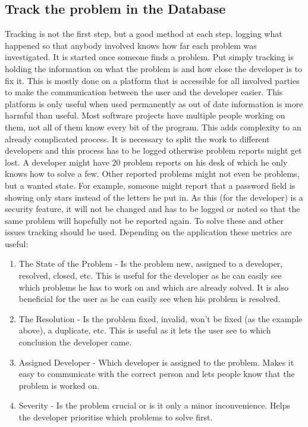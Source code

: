 \subsection{Track the problem in the Database}
\label{aodZellerTrack}
Tracking is not the first step, but a good method at each step, logging what happened so that anybody involved knows how far each problem was investigated. It is started once someone finds a problem. Put simply tracking is holding the information on what the problem is and how close the developer is to fix it. This is mostly done on a platform that is accessible for all involved parties to make the communication between the user and the developer easier. This platform is only useful when used permanently as out of date information is more harmful than useful. Most software projects have multiple people working on them, not all of them know every bit of the program. This adds complexity to an already complicated process. It is necessary to split the work to different developers and this process has to be logged otherwise problem reports might get lost. A developer might have 20 problem reports on his desk of which he only knows how to solve a few. Other reported problems might not even be problems, but a wanted state. For example, someone might report that a password field is showing only stars instead of the letters he put in. As this (for the developer) is a security feature, it will not be changed and has to be logged or noted so that the same problem will hopefully not be reported again. To solve these and other issues tracking should be used. Depending on the application these metrics are useful:
\begin{enumerate}
  \item The State of the Problem - Is the problem new, assigned to a developer,
resolved, closed, etc. This is useful for the developer as he can easily see which problems he has to work on and which are already solved. It is also beneficial for the user as he can easily see when his problem is resolved.
  \item The Resolution - Is the problem fixed, invalid, won't be fixed (as the example above), a duplicate, etc. This is useful as it lets the user see to which conclusion the developer came.
  \item Assigned Developer -  Which developer is assigned to the problem. Makes it easy to communicate with the correct person and lets people know that the problem is worked on.
  \item Severity - Is the problem crucial or is it only a minor inconvenience. Helps the developer prioritise which problems to solve first.
\end{enumerate}

